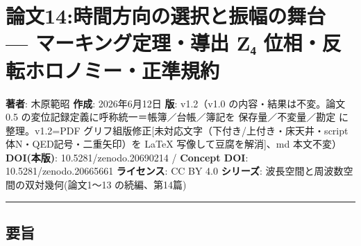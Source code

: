 \documentclass[
]{ltjsarticle}
\author{}
\date{}
\begin{document}
\section{論文14:時間方向の選択と振幅の舞台 --- マーキング定理・導出 Z₄
位相・反転ホロノミー・正準規約}\label{ux8ad6ux658714ux6642ux9593ux65b9ux5411ux306eux9078ux629eux3068ux632fux5e45ux306eux821eux53f0-ux30deux30fcux30adux30f3ux30b0ux5b9aux7406ux5c0eux51fa-zux2084-ux4f4dux76f8ux53cdux8ee2ux30dbux30edux30ceux30dfux30fcux6b63ux6e96ux898fux7d04}

\textbf{著者}: 木原範昭 \textbf{作成}: 2026年6月12日 \textbf{版}:
v1.2（v1.0 の内容・結果は不変。論文0.5
の変位記録定義に呼称統一＝帳簿／台帳／簿記を 保存量／不変量／勘定
に整理。v1.2=PDF
グリフ組版修正{[}未対応文字（下付き/上付き・床天井・script体N・QED記号・二重矢印）を
LaTeX 写像して豆腐を解消{]}、md 本文不変） \textbf{DOI(本版)}:
10.5281/zenodo.20690214 / \textbf{Concept DOI}: 10.5281/zenodo.20665661
\textbf{ライセンス}: CC BY 4.0 \textbf{シリーズ}:
波長空間と周波数空間の双対幾何(論文1〜13 の続編、第14篇)

\begin{center}\rule{0.5\linewidth}{0.5pt}\end{center}

\subsection{要旨}\label{ux8981ux65e8}
\end{document}
